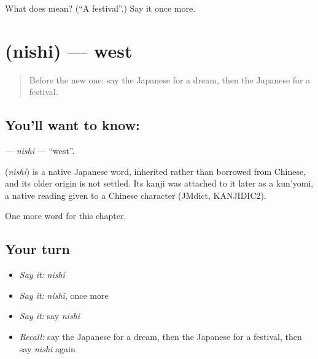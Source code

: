 \begin{tcolorbox}[breakable,colback=teal!4,colframe=teal!35!black,title={Before you move on}]
What does  mean? (\textquotedblleft{}A festival\textquotedblright{}.) Say it once more.
\end{tcolorbox}
\section[\texorpdfstring{\ja{にし} (nishi)}{にし (nishi)}]{ (nishi) — west}

\label{lesson:JA-C63-nishi}



\begin{quote}
Before the new one: say the Japanese for a dream, then the Japanese for a festival.
\end{quote}

\subsection*{You'll want to know: }
\textbf{} — \emph{nishi} — \textquotedblleft{}west\textquotedblright{}.

\begin{cousinweb}
\textbf{} (\emph{nishi}) is a native Japanese word, inherited rather than borrowed from Chinese, and its older origin is not settled. Its kanji was attached to it later as a kun'yomi, a native reading given to a Chinese character (JMdict, KANJIDIC2).
\end{cousinweb}

\begin{grammarlens}[title={What you've built}]
One more word for this chapter.
\end{grammarlens}

\subsection*{Your turn}
\begin{itemize}
\raggedright
  \item \emph{Say it:} \emph{nishi}
  \item \emph{Say it:} \emph{nishi}, once more
  \item \emph{Say it:} say \emph{nishi}
  \item \emph{Recall:} say the Japanese for a dream, then the Japanese for a festival, then say \emph{nishi} again
\end{itemize}

